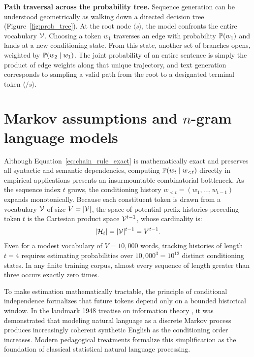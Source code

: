 \documentclass[../../main.tex]{subfiles}
\begin{document}
\noindent\textbf{Path traversal across the probability tree.}\newline
Sequence generation can be understood geometrically as walking down a directed decision tree (Figure~\ref{fig:prob_tree}). At the root node $\langle s \rangle$, the model confronts the entire vocabulary $\mathcal{V}$. Choosing a token $w_1$ traverses an edge with probability $\mathbb{P}(w_1)$ and lands at a new conditioning state. From this state, another set of branches opens, weighted by $\mathbb{P}(w_2 \mid w_1)$. The joint probability of an entire sentence is simply the product of edge weights along that unique trajectory, and text generation corresponds to sampling a valid path from the root to a designated terminal token $\langle /s \rangle$.

\clearpage
\section{Markov assumptions and $n$-gram language models}
\label{sec:markov_ngram}

Although Equation~\eqref{eq:chain_rule_exact} is mathematically exact and preserves all syntactic and semantic dependencies, computing $\mathbb{P}(w_t \mid w_{<t})$ directly in empirical applications presents an insurmountable combinatorial bottleneck. As the sequence index $t$ grows, the conditioning history $w_{<t} = (w_1, \dots, w_{t-1})$ expands monotonically. Because each constituent token is drawn from a vocabulary $\mathcal{V}$ of size $V = |\mathcal{V}|$, the space of potential prefix histories preceding token $t$ is the Cartesian product space $\mathcal{V}^{t-1}$, whose cardinality is:
\begin{equation}
\label{eq:state_space_unconstrained}
|\mathcal{H}_t| = |\mathcal{V}|^{t-1} = V^{t-1}.
\end{equation}
Even for a modest vocabulary of $V = 10{,}000$ words, tracking histories of length $t = 4$ requires estimating probabilities over $10{,}000^3 = 10^{12}$ distinct conditioning states. In any finite training corpus, almost every sequence of length greater than three occurs exactly zero times.

To make estimation mathematically tractable, the principle of conditional independence formalizes that future tokens depend only on a bounded historical window. In the landmark 1948 treatise on information theory \cite{shannon1948}, it was demonstrated that modeling natural language as a discrete Markov process produces increasingly coherent synthetic English as the conditioning order increases. Modern pedagogical treatments \cite{jurafsky2024} formalize this simplification as the foundation of classical statistical natural language processing.
\end{document}
